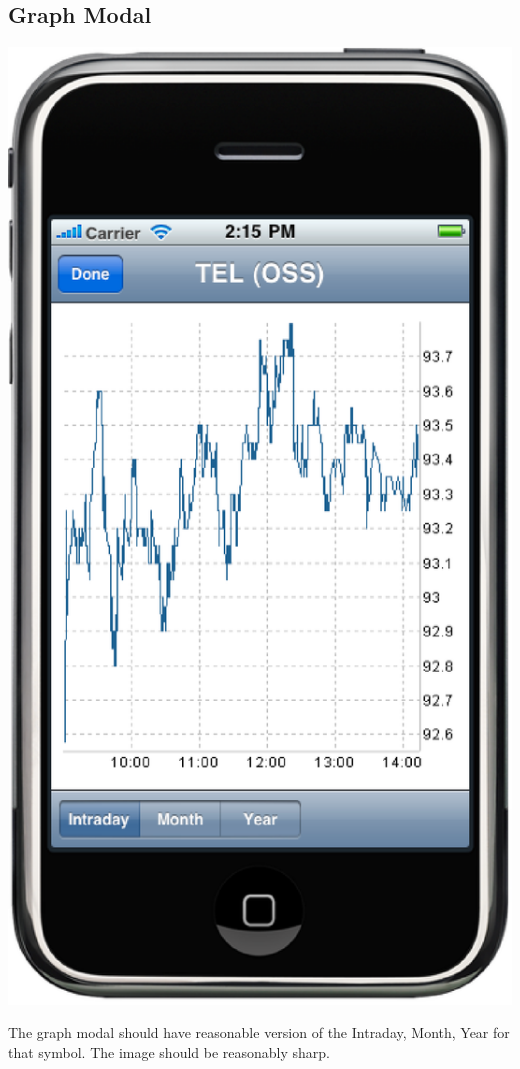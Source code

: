 \documentclass[12pt,twoside,letterpaper]{report}
\begin{document}
\subsection*{Graph Modal}
\includegraphics[scale=0.5]{symbolDetailGraphModal}

The graph modal should have reasonable version of the Intraday, Month, Year for that symbol. The image should be reasonably sharp.
\end{document}
